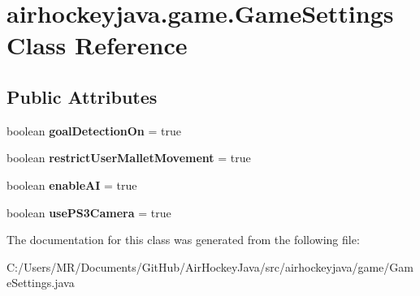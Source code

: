 \hypertarget{classairhockeyjava_1_1game_1_1_game_settings}{}\section{airhockeyjava.\+game.\+Game\+Settings Class Reference}
\label{classairhockeyjava_1_1game_1_1_game_settings}
\subsection*{Public Attributes}
\begin{DoxyCompactItemize}
\item 
\hypertarget{classairhockeyjava_1_1game_1_1_game_settings_a8103447310297ab7003e115ac8acb45e}{}boolean {\bfseries goal\+Detection\+On} = true\label{classairhockeyjava_1_1game_1_1_game_settings_a8103447310297ab7003e115ac8acb45e}

\item 
\hypertarget{classairhockeyjava_1_1game_1_1_game_settings_a40367d4c758c81eb69a1fffaa357383f}{}boolean {\bfseries restrict\+User\+Mallet\+Movement} = true\label{classairhockeyjava_1_1game_1_1_game_settings_a40367d4c758c81eb69a1fffaa357383f}

\item 
\hypertarget{classairhockeyjava_1_1game_1_1_game_settings_ae9a7b903e1ad5347634950843841bb79}{}boolean {\bfseries enable\+A\+I} = true\label{classairhockeyjava_1_1game_1_1_game_settings_ae9a7b903e1ad5347634950843841bb79}

\item 
\hypertarget{classairhockeyjava_1_1game_1_1_game_settings_a8bcd1d2f8a8a6d4250b3df104b95521d}{}boolean {\bfseries use\+P\+S3\+Camera} = true\label{classairhockeyjava_1_1game_1_1_game_settings_a8bcd1d2f8a8a6d4250b3df104b95521d}

\end{DoxyCompactItemize}


The documentation for this class was generated from the following file\+:\begin{DoxyCompactItemize}
\item 
C\+:/\+Users/\+M\+R/\+Documents/\+Git\+Hub/\+Air\+Hockey\+Java/src/airhockeyjava/game/Game\+Settings.\+java\end{DoxyCompactItemize}

